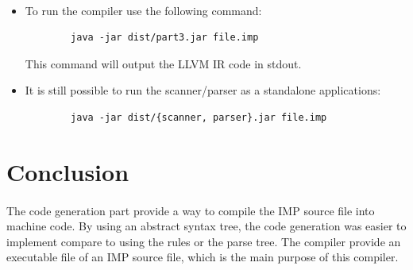 \documentclass[letterpaper]{article}
\begin{document}
\paragraph{}

\begin{itemize}
    \item To run the compiler use the following command:
    \begin{lstlisting}
        java -jar dist/part3.jar file.imp
    \end{lstlisting}
    This command will output the LLVM IR code in stdout.
    \item It is still possible to run the scanner/parser
    as a standalone applications:
    \begin{lstlisting}
        java -jar dist/{scanner, parser}.jar file.imp
    \end{lstlisting}
\end{itemize}

\section{Conclusion}

\paragraph{}

The code generation part provide a way to compile the IMP source file
into machine code. By using an abstract syntax tree, the code generation
was easier to implement compare to using the rules or the parse tree.
The compiler provide an executable file
of an IMP source file, which is the main purpose of this compiler.
\end{document}
